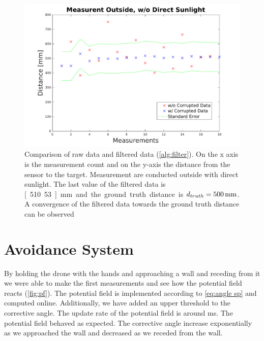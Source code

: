 \begin{figure}
	\centering
	\includegraphics[width=0.9\linewidth]{pictures/plot_filter_sun.pdf}
	\caption{Comparison of raw data and filtered data (\cref{alg:filter}). On the x axis is the measurement count and on the y-axis the distance from the sensor to the target. Measurement are conducted outside with direct sunlight. The last value of the filtered data is \unit[510.53]{mm} and the ground truth distance is $d_{truth}=\unit[500]{mm}$. A convergence of the filtered data towards the ground truth distance can be observed}
	\label{fig:meas_out_sun filter}
\end{figure}


\section{Avoidance System}
\label{sec:avoidance}
By holding the drone with the hands and approaching a wall and receding from it we were able to make the first measurements and see how the potential field reacts (\cref{fig:pf}). The potential field is implemented according to \cref{eq:angle sp} and computed online. Additionally, we have added an upper threshold to the corrective angle. The update rate of the potential field is around \unit[200]{ms}. The potential field behaved as expected. The corrective angle increase exponentially as we approached the wall and decreased as we receded from the wall.\\


